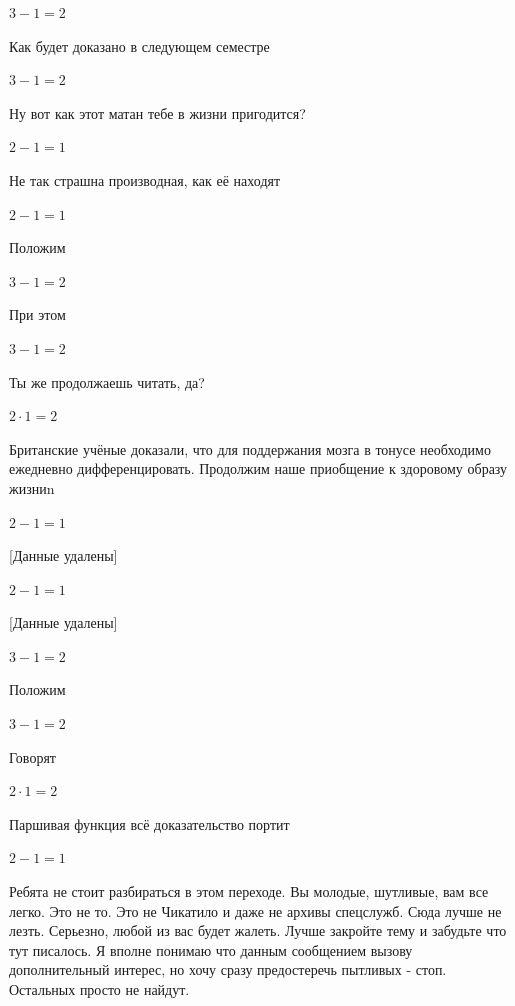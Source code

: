 \documentclass[12pt,a4paper,fleqn]{article}
\begin{document}
\begin{center}$3-1 = 2$\end{center}
Как будет доказано в следующем семестре

\begin{center}$3-1 = 2$\end{center}
Ну вот как этот матан тебе в жизни пригодится?

\begin{center}$2-1 = 1$\end{center}
Не так страшна производная, как её находят\cite{link2}

\begin{center}$2-1 = 1$\end{center}
Положим

\begin{center}$3-1 = 2$\end{center}
При этом

\begin{center}$3-1 = 2$\end{center}
Ты же продолжаешь читать, да?

\begin{center}$2 \cdot 1 = 2$\end{center}
Британские учёные доказали, что для поддержания мозга в тонусе необходимо ежедневно дифференцировать. Продолжим наше приобщение к здоровому образу жизниn

\begin{center}$2-1 = 1$\end{center}
[Данные удалены]

\begin{center}$2-1 = 1$\end{center}
[Данные удалены]

\begin{center}$3-1 = 2$\end{center}
Положим

\begin{center}$3-1 = 2$\end{center}
Говорят

\begin{center}$2 \cdot 1 = 2$\end{center}
Паршивая функция всё доказательство портит\cite{link2}

\begin{center}$2-1 = 1$\end{center}
Ребята не стоит разбираться в этом переходе. Вы молодые, шутливые, вам все легко. Это не то. Это не Чикатило и даже не архивы спецслужб. Сюда лучше не лезть. Серьезно, любой из вас будет жалеть. Лучше закройте тему и забудьте что тут писалось. Я вполне понимаю что данным сообщением вызову дополнительный интерес, но хочу сразу предостеречь пытливых - стоп. Остальных просто не найдут.
\end{document}

